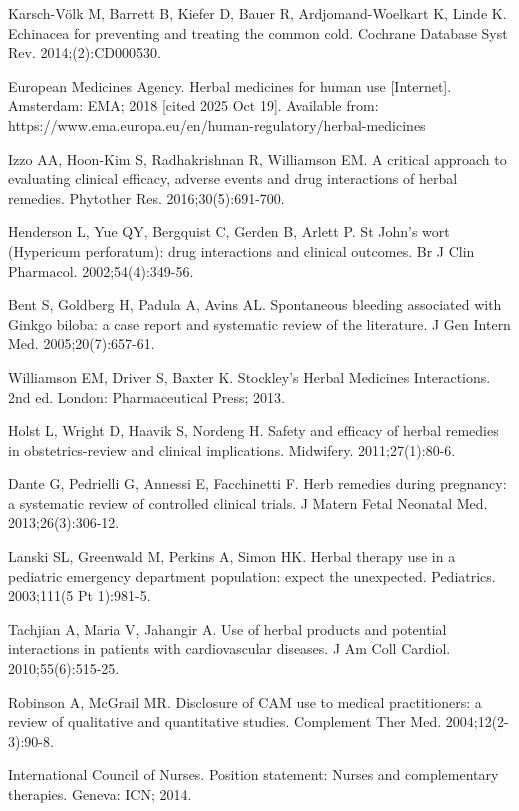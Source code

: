 \documentclass[12pt,a4paper]{article}
\begin{document}
\begin{thebibliography}{99}
Karsch-Völk M, Barrett B, Kiefer D, Bauer R, Ardjomand-Woelkart K, Linde K. Echinacea for preventing and treating the common cold. Cochrane Database Syst Rev. 2014;(2):CD000530.

European Medicines Agency. Herbal medicines for human use [Internet]. Amsterdam: EMA; 2018 [cited 2025 Oct 19]. Available from: https://www.ema.europa.eu/en/human-regulatory/herbal-medicines

Izzo AA, Hoon-Kim S, Radhakrishnan R, Williamson EM. A critical approach to evaluating clinical efficacy, adverse events and drug interactions of herbal remedies. Phytother Res. 2016;30(5):691-700.

Henderson L, Yue QY, Bergquist C, Gerden B, Arlett P. St John's wort (Hypericum perforatum): drug interactions and clinical outcomes. Br J Clin Pharmacol. 2002;54(4):349-56.

Bent S, Goldberg H, Padula A, Avins AL. Spontaneous bleeding associated with Ginkgo biloba: a case report and systematic review of the literature. J Gen Intern Med. 2005;20(7):657-61.

Williamson EM, Driver S, Baxter K. Stockley's Herbal Medicines Interactions. 2nd ed. London: Pharmaceutical Press; 2013.

Holst L, Wright D, Haavik S, Nordeng H. Safety and efficacy of herbal remedies in obstetrics-review and clinical implications. Midwifery. 2011;27(1):80-6.

Dante G, Pedrielli G, Annessi E, Facchinetti F. Herb remedies during pregnancy: a systematic review of controlled clinical trials. J Matern Fetal Neonatal Med. 2013;26(3):306-12.

Lanski SL, Greenwald M, Perkins A, Simon HK. Herbal therapy use in a pediatric emergency department population: expect the unexpected. Pediatrics. 2003;111(5 Pt 1):981-5.

Tachjian A, Maria V, Jahangir A. Use of herbal products and potential interactions in patients with cardiovascular diseases. J Am Coll Cardiol. 2010;55(6):515-25.

Robinson A, McGrail MR. Disclosure of CAM use to medical practitioners: a review of qualitative and quantitative studies. Complement Ther Med. 2004;12(2-3):90-8.

International Council of Nurses. Position statement: Nurses and complementary therapies. Geneva: ICN; 2014.


\end{thebibliography}
\end{document}
